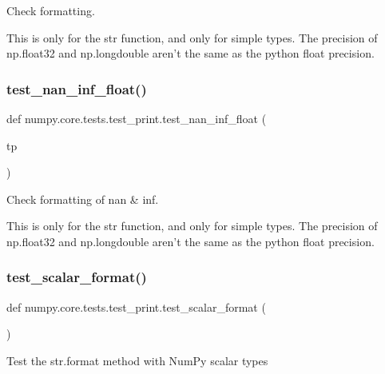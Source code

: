 \begin{DoxyVerb}Check formatting.

    This is only for the str function, and only for simple types.
    The precision of np.float32 and np.longdouble aren't the same as the
    python float precision.\end{DoxyVerb}
 \mbox{\label{namespacenumpy_1_1core_1_1tests_1_1test__print_a1db14b60951812cd3738b73fe472ccdf}} 
\subsubsection{\texorpdfstring{test\+\_\+nan\+\_\+inf\+\_\+float()}{test\_nan\_inf\_float()}}
{\footnotesize\ttfamily def numpy.\+core.\+tests.\+test\+\_\+print.\+test\+\_\+nan\+\_\+inf\+\_\+float (\begin{DoxyParamCaption}\item[{}]{tp }\end{DoxyParamCaption})}

\begin{DoxyVerb}Check formatting of nan & inf.

    This is only for the str function, and only for simple types.
    The precision of np.float32 and np.longdouble aren't the same as the
    python float precision.\end{DoxyVerb}
 \mbox{\label{namespacenumpy_1_1core_1_1tests_1_1test__print_aa204566ea8023a214404048a3edc4921}} 
\subsubsection{\texorpdfstring{test\+\_\+scalar\+\_\+format()}{test\_scalar\_format()}}
{\footnotesize\ttfamily def numpy.\+core.\+tests.\+test\+\_\+print.\+test\+\_\+scalar\+\_\+format (\begin{DoxyParamCaption}{ }\end{DoxyParamCaption})}

\begin{DoxyVerb}Test the str.format method with NumPy scalar types\end{DoxyVerb}
 